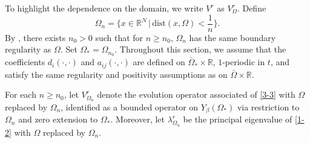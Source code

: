 \documentclass[11pt,reqno]{amsart}
\numberwithin{equation}{section}
\begin{document}
To highlight the dependence on the domain, we write $V^{r}$ as $V^{r}_{\Omega}$.
Define $$\Omega_{n} = \{ x\in\mathbb{R}^{N} \,|\, \text{dist}(x,\Omega) < \frac{1}{n} \}. $$ By \cite{Foote}, there exists $n_{0}>0$ such that for $n\geq n_{0}$, $\Omega_{n}$ has the same boundary regularity as $\Omega$.
Set $\Omega_{*} = \Omega_{n_{0}}$.
Throughout this section, we assume that the coefficients
$d_i(\cdot,\cdot)$ and $a_{ij}(\cdot,\cdot)$ are defined on $\bar{\Omega}_{*}\times\mathbb{R}$,
$1$-periodic in $t$, and satisfy the same regularity and positivity assumptions as on $\bar{\Omega}\times\mathbb{R}$.

For each $n\geq n_{0}$, let $V^{r}_{\Omega_{n}}$ denote the evolution operator associated of \eqref{3-3} with $\Omega$ replaced by $\Omega_n$, identified as a bounded operator on $Y_{\beta}(\Omega_{*})$ via restriction
to $\Omega_n$ and zero extension to $\Omega_{*}$.
Moreover, let $\lambda^{r}_{\Omega_{n}}$ be the principal eigenvalue of \eqref{1-2} with $\Omega$ replaced by $\Omega_{n}$.
\end{document}
